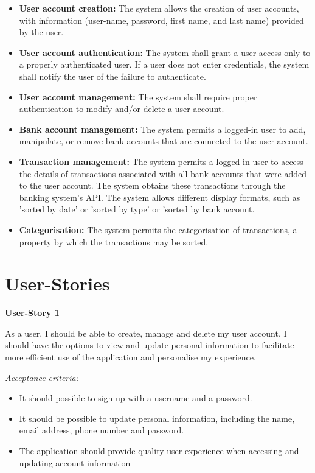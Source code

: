 \documentclass[11pt]{article}
\newcounter{use case ID}
\newcounter{req ID}
\begin{document}
\begin{itemize}
    \item  \textbf{User account creation:} The system allows the creation of user accounts, with information (user-name, password, first name, and last name) provided by the user.
    \item \textbf{User account authentication:} The system shall grant a user access only to a properly authenticated user. If a user does not enter credentials, the system shall notify the user of the failure to authenticate.
    \item \textbf{User account management:} The system shall require proper authentication to modify and/or delete a user account.
    \item  \textbf{Bank account management:} The system permits a logged-in user to add, manipulate, or remove bank accounts that are connected to the user account.
    \item  \textbf{Transaction management:} The system permits a logged-in user to access the details of transactions associated with all bank accounts that were added to the user account. The system obtains these transactions through the banking system's API. The system allows different display formats, such as 'sorted by date' or 'sorted by type' or 'sorted by bank account.
    \item \textbf{Categorisation:} The system permits the categorisation of transactions, a property by which the transactions may be sorted.
    \end{itemize}

\section{User-Stories}

\textbf{User-Story 1}

As a user, I should be able to create, manage and delete my user account. I should have the options to view and update personal information to facilitate more efficient use of the application and personalise my experience. 

\textit{Acceptance criteria:}
\begin{itemize}
    \item It should possible to sign up with a username and a password.
    \item It should be possible to update personal information, including the name, email address, phone number and password.
    \item The application should provide quality user experience when accessing and updating account information
\end{itemize}
\end{document}
